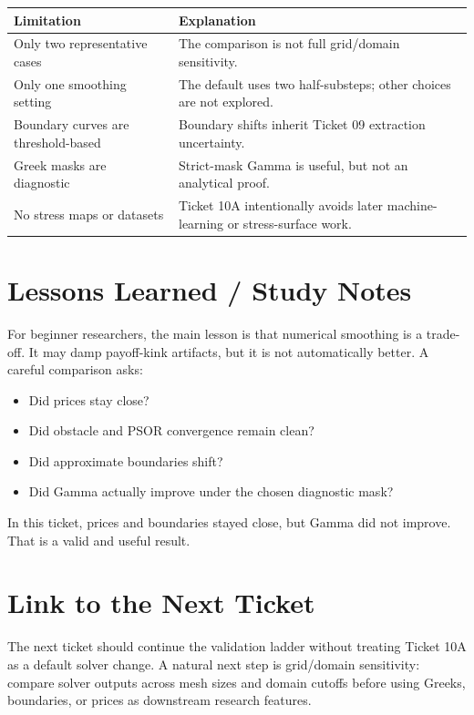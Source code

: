 \documentclass[11pt,a4paper]{article}
\begin{document}
\begin{longtable}{P{0.32\textwidth}L{0.48\textwidth}}
\toprule
Limitation & Explanation \\
\midrule
\endhead
Only two representative cases & The comparison is not full grid/domain sensitivity. \\
Only one smoothing setting & The default uses two half-substeps; other choices are not explored. \\
Boundary curves are threshold-based & Boundary shifts inherit Ticket 09 extraction uncertainty. \\
Greek masks are diagnostic & Strict-mask Gamma is useful, but not an analytical proof. \\
No stress maps or datasets & Ticket 10A intentionally avoids later machine-learning or stress-surface work. \\
\bottomrule
\end{longtable}

\section{Lessons Learned / Study Notes}

For beginner researchers, the main lesson is that numerical smoothing is a trade-off. It may damp
payoff-kink artifacts, but it is not automatically better. A careful comparison asks:
\begin{itemize}
  \item Did prices stay close?
  \item Did obstacle and PSOR convergence remain clean?
  \item Did approximate boundaries shift?
  \item Did Gamma actually improve under the chosen diagnostic mask?
\end{itemize}

In this ticket, prices and boundaries stayed close, but Gamma did not improve. That is a valid
and useful result.

\section{Link to the Next Ticket}

The next ticket should continue the validation ladder without treating Ticket 10A as a default
solver change. A natural next step is grid/domain sensitivity: compare solver outputs across
mesh sizes and domain cutoffs before using Greeks, boundaries, or prices as downstream research
features.
\end{document}

